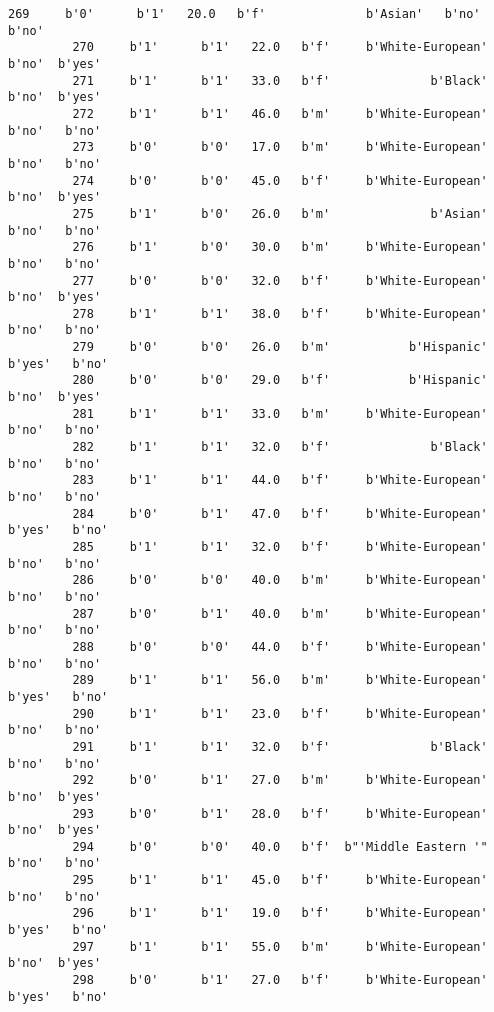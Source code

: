 \documentclass[11pt]{article}
\begin{document}
\begin{Verbatim}[commandchars=\\\{\}]
         269     b'0'      b'1'   20.0   b'f'              b'Asian'   b'no'   b'no'   
         270     b'1'      b'1'   22.0   b'f'     b'White-European'   b'no'  b'yes'   
         271     b'1'      b'1'   33.0   b'f'              b'Black'   b'no'  b'yes'   
         272     b'1'      b'1'   46.0   b'm'     b'White-European'   b'no'   b'no'   
         273     b'0'      b'0'   17.0   b'm'     b'White-European'   b'no'   b'no'   
         274     b'0'      b'0'   45.0   b'f'     b'White-European'   b'no'  b'yes'   
         275     b'1'      b'0'   26.0   b'm'              b'Asian'   b'no'   b'no'   
         276     b'1'      b'0'   30.0   b'm'     b'White-European'   b'no'   b'no'   
         277     b'0'      b'0'   32.0   b'f'     b'White-European'   b'no'  b'yes'   
         278     b'1'      b'1'   38.0   b'f'     b'White-European'   b'no'   b'no'   
         279     b'0'      b'0'   26.0   b'm'           b'Hispanic'  b'yes'   b'no'   
         280     b'0'      b'0'   29.0   b'f'           b'Hispanic'   b'no'  b'yes'   
         281     b'1'      b'1'   33.0   b'm'     b'White-European'   b'no'   b'no'   
         282     b'1'      b'1'   32.0   b'f'              b'Black'   b'no'   b'no'   
         283     b'1'      b'1'   44.0   b'f'     b'White-European'   b'no'   b'no'   
         284     b'0'      b'1'   47.0   b'f'     b'White-European'  b'yes'   b'no'   
         285     b'1'      b'1'   32.0   b'f'     b'White-European'   b'no'   b'no'   
         286     b'0'      b'0'   40.0   b'm'     b'White-European'   b'no'   b'no'   
         287     b'0'      b'1'   40.0   b'm'     b'White-European'   b'no'   b'no'   
         288     b'0'      b'0'   44.0   b'f'     b'White-European'   b'no'   b'no'   
         289     b'1'      b'1'   56.0   b'm'     b'White-European'  b'yes'   b'no'   
         290     b'1'      b'1'   23.0   b'f'     b'White-European'   b'no'   b'no'   
         291     b'1'      b'1'   32.0   b'f'              b'Black'   b'no'   b'no'   
         292     b'0'      b'1'   27.0   b'm'     b'White-European'   b'no'  b'yes'   
         293     b'0'      b'1'   28.0   b'f'     b'White-European'   b'no'  b'yes'   
         294     b'0'      b'0'   40.0   b'f'  b"'Middle Eastern '"   b'no'   b'no'   
         295     b'1'      b'1'   45.0   b'f'     b'White-European'   b'no'   b'no'   
         296     b'1'      b'1'   19.0   b'f'     b'White-European'  b'yes'   b'no'   
         297     b'1'      b'1'   55.0   b'm'     b'White-European'   b'no'  b'yes'   
         298     b'0'      b'1'   27.0   b'f'     b'White-European'  b'yes'   b'no'   

\end{Verbatim}
\end{document}
